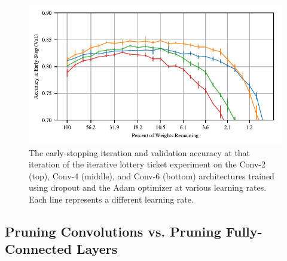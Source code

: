 \begin{figure}
\includegraphics[width=.5\textwidth]{graphs/cifar10/conv/dropout_adam_rate_sweep3/accuracy}
\caption{The early-stopping iteration and validation accuracy at that iteration  of the iterative lottery ticket experiment on the Conv-2 (top), Conv-4 (middle),
and Conv-6 (bottom) architectures trained using dropout and
the Adam optimizer at various learning rates. Each line represents a different learning rate.}
\label{fig:appendix-conv-adam-dropout}
\end{figure}

\subsection{Pruning Convolutions vs. Pruning Fully-Connected Layers}

